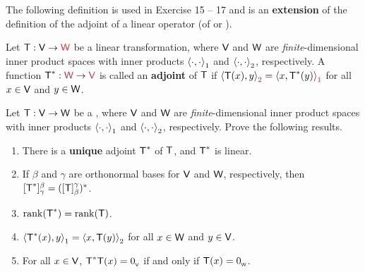 The following definition is used in Exercise 15 -- 17 and is an \textbf{extension} of the definition of the adjoint of a linear operator (of  or ).

\begin{additional definition} \label{adef 6.5}
Let \(\T : \V \to \RED{\W}\) be a linear transformation, where \(\textsf{V}\) and \(\textsf{W}\) are \emph{finite}-dimensional inner product spaces with inner products \(\left< \cdot, \cdot \right>_1\) and \(\left< \cdot, \cdot \right>_2\), respectively.
A function \(\T^*: \MAROON{\W} \to \RED{\V}\) is called an \textbf{adjoint} of \(\textsf{T}\) if \(\LG \T(x), y \RG_{\MAROON{2}}
= \LG x, \T^*(y) \RG_{\RED{1}}\) for all \(x \in \textsf{V}\) and \(y \in \textsf{W}\).
\end{additional definition}

\begin{exercise} \label{exercise 6.3.15}
Let \(\textsf{T} : \textsf{V} \to \textsf{W}\) be a \LTRAN{}, where \(\textsf{V}\) and \(\textsf{W}\) are \emph{finite}-dimensional inner product spaces with inner products \(\left< \cdot, \cdot \right>_1\) and \(\left< \cdot, \cdot \right>_2\), respectively.
Prove the following results.
\begin{enumerate}
\item There is a \textbf{unique} adjoint \(\textsf{T}^*\) of \(\textsf{T}\), and \(\textsf{T}^*\) is linear.
\item If \(\beta\) and \(\gamma\) are orthonormal bases for \(\textsf{V}\) and \(\textsf{W}\), respectively, then \([\textsf{T}^*]_{\gamma}^{\beta} = ([\textsf{T}]_{\beta}^{\gamma})^*\).
\item \(\mathrm{rank}(\textsf{T}^*) = \mathrm{rank}(\textsf{T})\).
\item \(\left< \textsf{T}^*(x), y \right>_1 = \left< x, \textsf{T}(y) \right>_2\) for all \(x \in \textsf{W}\) and \(y \in \textsf{V}\).
\item For all \(x \in \textsf{V}\), \(\textsf{T}^*\textsf{T}(x) = 0_{_{\textsf{V}}}\) if and only if \(\textsf{T}(x) = 0_{_{\textsf{W}}}\).
\end{enumerate}
\end{exercise}

